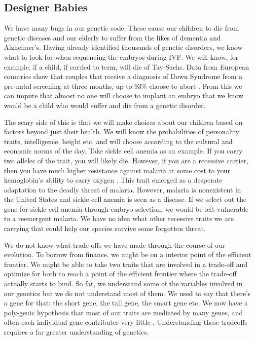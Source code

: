 \subsection{Designer Babies}

We have many bugs in our genetic code.
These cause our children to die from genetic diseases and our elderly to suffer from the likes of dementia and Alzheimer's.
Having already identified thousands of genetic disorders, we know what to look for when sequencing the embryos during IVF.
We will know, for example, if a child, if carried to term, will die of Tay-Sachs.
Data from European countries show that couples that receive a diagnosis of Down Syndrome from a pre-natal screening at three months, up to 93\% choose to abort \cite{Natoli2012}.
From this we can impute that almost no one will choose to implant an embryo that we know would be a child who would suffer and die from a genetic disorder.

The scary side of this is that we will make choices about our children based on factors beyond just their health.
We will know the probabilities of personality traits, intelligence, height etc. and will choose according to the cultural and economic norms of the day.
Take sickle cell anemia as an example.
If you carry two alleles of the trait, you will likely die.
However, if you are a recessive carrier, then you have much higher resistance against malaria at some cost to your hemoglobin's ability to carry oxygen \cite{Lamonte2012}.
This trait emerged as a desperate adaptation to the deadly threat of malaria.
However, malaria is nonexistent in the United States and sickle cell anemia is seen as a disease.
If we select out the gene for sickle cell anemia through embryo-selection, we would be left vulnerable to a reemergent malaria.
We have no idea what other recessive traits we are carrying that could help our species survive some forgotten threat.

We do not know what trade-offs we have made through the course of our evolution.
To borrow from finance, we might be on a interior point of the efficient frontier.
We might be able to take two traits that are involved in a trade-off and optimize for both to reach a point of the efficient frontier where the trade-off actually starts to bind.
So far, we understand some of the variables involved in our genetics but we do not understand most of them.
We used to say that there's a gene for that: the short gene, the tall gene, the smart gene etc.
We now have a poly-genic hypothesis that most of our traits are mediated by many genes, and often each individual gene contributes very little \cite{polygenic2016}.
Understanding these tradeoffs requires a far greater understanding of genetics.

